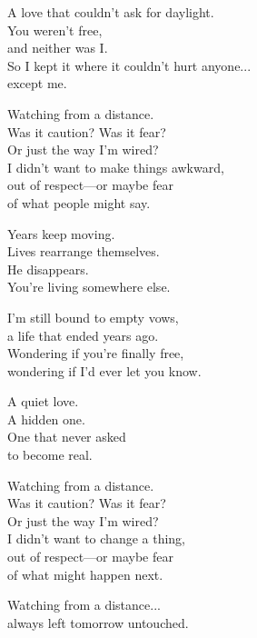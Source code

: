 \begin{lyrics}
A love that couldn't ask for daylight.\\
You weren't free,\\
and neither was I.\\
So I kept it where it couldn't hurt anyone...\\
except me.

Watching from a distance.\\
Was it caution? Was it fear?\\
Or just the way I'm wired?\\
I didn't want to make things awkward,\\
out of respect—or maybe fear\\
of what people might say.

Years keep moving.\\
Lives rearrange themselves.\\
He disappears.\\
You're living somewhere else.

I'm still bound to empty vows,\\
a life that ended years ago.\\
Wondering if you're finally free,\\
wondering if I'd ever let you know.

A quiet love.\\
A hidden one.\\
One that never asked\\
to become real.

Watching from a distance.\\
Was it caution? Was it fear?\\
Or just the way I'm wired?\\
I didn't want to change a thing,\\
out of respect—or maybe fear\\
of what might happen next.

Watching from a distance...\\
always left tomorrow untouched.
\end{lyrics}

